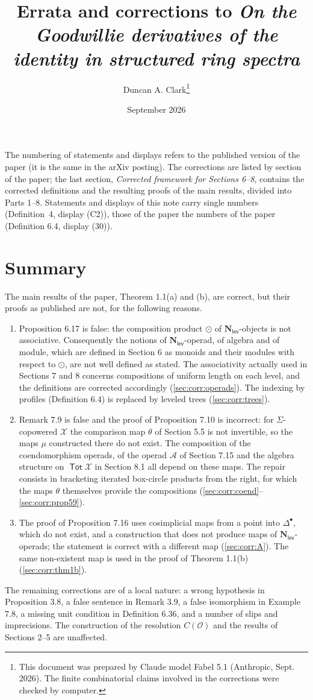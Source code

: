\documentclass[12pt]{article}
\title{Errata and corrections to \emph{On the Goodwillie derivatives of the identity in structured ring spectra}}
\author{Duncan A. Clark\thanks{This document was prepared by Claude model Fabel 5.1 (Anthropic, Sept. 2026). The finite combinatorial claims involved in the corrections were checked by computer.}}
\date{September 2026}
\theoremstyle{plain}
\theoremstyle{definition}
\theoremstyle{remark}
\newcommand{\Cal}[1]{\mathcal{#1}}
\newcommand{\Tot}{\operatorname{\mathsf{Tot}}}
\newcommand{\Nl}{\mathbf{N}_{\mathsf{lev}}}
\newcommand{\circdot}{\odot}
\begin{document}
\maketitle

\noindent The numbering of statements and displays refers to the published version of the paper (it is the same in the arXiv posting). The corrections are listed by section of the paper; the last section, \emph{Corrected framework for Sections 6--8}, contains the corrected definitions and the resulting proofs of the main results, divided into Parts 1--8. Statements and displays of this note carry single numbers (Definition~4, display (C2)), those of the paper the numbers of the paper (Definition 6.4, display (30)).

\section*{Summary}
\label{sec:summary}

The main results of the paper, Theorem 1.1(a) and (b), are correct, but their proofs as published are not, for the following reasons.
\begin{enumerate}[leftmargin=2em,itemsep=2pt]
\item Proposition 6.17 is false: the composition product $\circdot$ of $\Nl$-objects is not associative. Consequently the notions of $\Nl$-operad, of algebra and of module, which are defined in Section 6 as monoids and their modules with respect to $\circdot$, are not well defined as stated. The associativity actually used in Sections 7 and 8 concerns compositions of uniform length on each level, and the definitions are corrected accordingly (\ref{sec:corr:operads}). The indexing by profiles (Definition 6.4) is replaced by leveled trees (\ref{sec:corr:trees}).
\item Remark 7.9 is false and the proof of Proposition 7.10 is incorrect: for $\Sigma$-copowered $\Cal X$ the comparison map $\theta$ of Section 5.5 is not invertible, so the maps $\mu$ constructed there do not exist. The composition of the coendomorphism operads, of the operad $\Cal A$ of Section 7.15 and the algebra structure on $\Tot\Cal X$ in Section 8.1 all depend on these maps. The repair consists in bracketing iterated box-circle products from the right, for which the maps $\theta$ themselves provide the compositions (\ref{sec:corr:coend}--\ref{sec:corr:prop59}).
\item The proof of Proposition 7.16 uses cosimplicial maps from a point into $\Delta^\bullet$, which do not exist, and a construction that does not produce maps of $\Nl$-operads; the statement is correct with a different map (\ref{sec:corr:A}). The same non-existent map is used in the proof of Theorem 1.1(b) (\ref{sec:corr:thm1b}).
\end{enumerate}
The remaining corrections are of a local nature: a wrong hypothesis in Proposition 3.8, a false sentence in Remark 3.9, a false isomorphism in Example 7.8, a missing unit condition in Definition 6.36, and a number of slips and imprecisions. The construction of the resolution $C(\Cal O)$ and the results of Sections 2--5 are unaffected.
\end{document}
